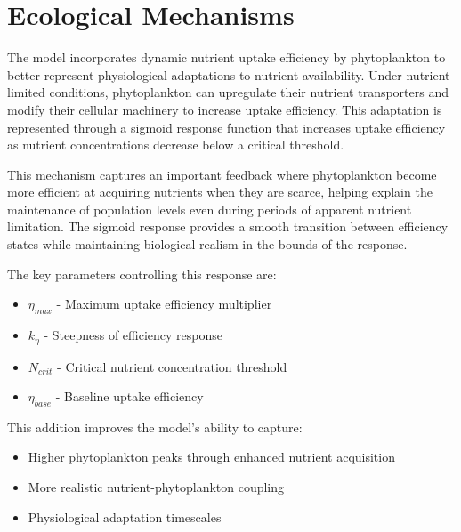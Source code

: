 \section{Ecological Mechanisms}

The model incorporates dynamic nutrient uptake efficiency by phytoplankton to better represent physiological adaptations to nutrient availability. Under nutrient-limited conditions, phytoplankton can upregulate their nutrient transporters and modify their cellular machinery to increase uptake efficiency. This adaptation is represented through a sigmoid response function that increases uptake efficiency as nutrient concentrations decrease below a critical threshold.

This mechanism captures an important feedback where phytoplankton become more efficient at acquiring nutrients when they are scarce, helping explain the maintenance of population levels even during periods of apparent nutrient limitation. The sigmoid response provides a smooth transition between efficiency states while maintaining biological realism in the bounds of the response.

The key parameters controlling this response are:
\begin{itemize}
\item $\eta_{max}$ - Maximum uptake efficiency multiplier
\item $k_{\eta}$ - Steepness of efficiency response
\item $N_{crit}$ - Critical nutrient concentration threshold
\item $\eta_{base}$ - Baseline uptake efficiency
\end{itemize}

This addition improves the model's ability to capture:
\begin{itemize}
\item Higher phytoplankton peaks through enhanced nutrient acquisition
\item More realistic nutrient-phytoplankton coupling
\item Physiological adaptation timescales
\end{itemize}
